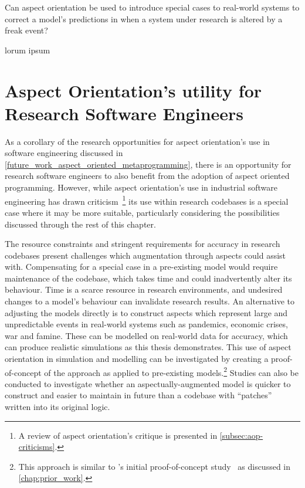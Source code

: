 \begin{researchquestion}
Can aspect orientation be used to introduce special cases to real-world systems
to correct a model's predictions in when a system under research is altered by a
freak event?
\end{researchquestion}

lorum  ipsum


\section{Aspect Orientation's utility for Research Software Engineers}
\label{future_work_aop_for_rses}

As a corollary of the research opportunities for aspect orientation's use in
software engineering discussed in \cref{future_work_aspect_oriented_metaprogramming},
there is an opportunity for research software engineers to also benefit from the
adoption of aspect oriented programming. However, while aspect orientation's use
in industrial software engineering has drawn
criticism~\cite{steimann06paradoxical,przybylek2010wrong,Constantinides04aopconsidered}\footnote{A
review of aspect orientation's critique is presented in
\cref{subsec:aop-criticisms}.} its use within research codebases is a special
case where it may be more suitable, particularly considering the possibilities
discussed through the rest of this chapter.

The resource constraints and stringent requirements for accuracy in research
codebases present challenges which augmentation through aspects could
assist with. Compensating for a special case in a pre-existing model would
require maintenance of the codebase, which takes time and could inadvertently
alter its behaviour. Time is a scarce resource in research environments, and
undesired changes to a model's behaviour can invalidate research results. An
alternative to adjusting the models directly is to construct aspects which
represent large and unpredictable events in real-world systems such as
pandemics, economic crises, war and famine. These can be modelled on real-world
data for accuracy, which can produce realistic simulations as this thesis
demonstrates. This use of aspect orientation in simulation and modelling can be
investigated by creating a proof-of-concept of the approach as applied to
pre-existing models.\footnote{This approach is similar to \pdsf{}'s initial
proof-of-concept study~\cite{wallis2018caise} as discussed in
\cref{chap:prior_work}.} Studies can also be conducted to investigate whether an
aspectually-augmented model is quicker to construct and easier to maintain in
future than a codebase with ``patches'' written into its original logic.

